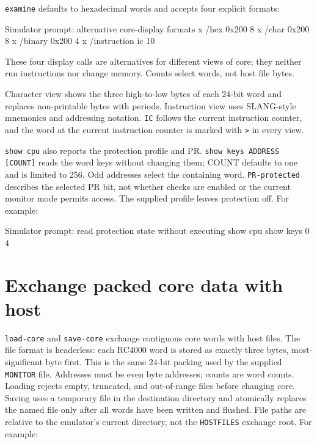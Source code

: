 \passthrough{\lstinline!examine!} defaults to hexadecimal words and accepts four explicit formats:

\begin{commandexample}{Simulator prompt: alternative core-display formats}
x /hex 0x200 8
x /char 0x200 8
x /binary 0x200 4
x /instruction ic 10
\end{commandexample}

These four display calls are alternatives for different views of core; they neither run instructions nor change memory. Counts select words, not host file bytes.

Character view shows the three high-to-low bytes of each 24-bit word and replaces non-printable bytes with periods. Instruction view uses SLANG-style mnemonics and addressing notation. \passthrough{\lstinline!IC!} follows the current instruction counter, and the word at the current instruction counter is marked with \passthrough{\lstinline!>!} in every view.

\passthrough{\lstinline!show cpu!} also reports the protection profile and PR.
\passthrough{\lstinline!show keys ADDRESS [COUNT]!} reads the word keys without
changing them; COUNT defaults to one and is limited to 256. Odd addresses select
the containing word. \passthrough{\lstinline!PR-protected!} describes the selected
PR bit, not whether checks are enabled or the current monitor mode permits
access. The supplied profile leaves protection off. For example:

\begin{commandexample}{Simulator prompt: read protection state without executing}
show cpu
show keys 0 4
\end{commandexample}

\section{Exchange packed core data with host}\label{exchange-packed-core-data-with-host}

\passthrough{\lstinline!load-core!} and \passthrough{\lstinline!save-core!} exchange contiguous core words with host files. The file format is headerless: each RC4000 word is stored as exactly three bytes, most-significant byte first. This is the same 24-bit packing used by the supplied \passthrough{\lstinline!MONITOR!} file. Addresses must be even byte addresses; counts are word counts. Loading rejects empty, truncated, and out-of-range files before changing core. Saving uses a temporary file in the destination directory and atomically replaces the named file only after all words have been written and flushed. File paths are relative to the emulator's current directory, not the \passthrough{\lstinline!HOSTFILES!} exchange root. For example:

